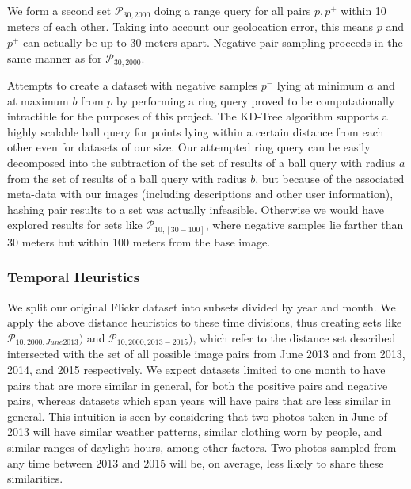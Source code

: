 We form a second set $\mathcal{P}_{30,2000}$ doing a range query for all pairs $p, p^+$ within 10 meters of each other. Taking into account our geolocation error, this means $p$ and $p^+$ can actually be up to 30 meters apart. Negative pair sampling proceeds in the same manner as for $\mathcal{P}_{30,2000}$. 

Attempts to create a dataset with negative samples $p^-$ lying at minimum $a$ and at maximum $b$ from $p$ by performing a ring query proved to be computationally intractible for the purposes of this project. The KD-Tree algorithm supports a highly scalable ball query for points lying within a certain distance from each other even for datasets of our size. Our attempted ring query can be easily decomposed into the subtraction of the set of results of a ball query with radius $a$ from the set of results of a ball query with radius $b$, but because of the associated meta-data with our images (including descriptions and other user information), hashing pair results to a set was actually infeasible. Otherwise we would have explored results for sets like $\mathcal{P}_{10,[30-100]}$, where negative samples lie farther than 30 meters but within 100 meters from the base image.

\subsubsection{Temporal Heuristics}
We split our original Flickr dataset into subsets divided by year and month. We apply the above distance heuristics to these time divisions, thus creating sets like $\mathcal{P}_{10,2000,June2013})$ and $\mathcal{P}_{10,2000,2013-2015})$, which refer to the distance set described intersected with the set of all possible image pairs from June 2013 and from 2013, 2014, and 2015 respectively. We expect datasets limited to one month to have pairs that are more similar in general, for both the positive pairs and negative pairs, whereas datasets which span years will have pairs that are less similar in general. This intuition is seen by considering that two photos taken in June of 2013 will have similar weather patterns, similar clothing worn by people, and similar ranges of daylight hours, among other factors. Two photos sampled from any time between 2013 and 2015 will be, on average, less likely to share these similarities. 

